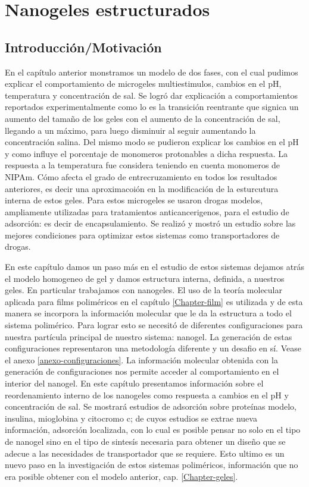 \chapter{Nanogeles estructurados}
\label{Chapter-esfericas}
\section{Introducci\'on/Motivaci\'on}

En el cap\'itulo anterior monstramos un modelo de dos fases, con el cual pudimos explicar el comportamiento de microgeles multiestimulos, cambios en el pH, temperatura y concentraci\'on de sal.
Se logró dar explicación a comportamientos reportados experimentalmente como lo es la transición reentrante que signica un aumento del tama\~no de los geles con el aumento de la concentraci\'on de sal, llegando a un m\'aximo, para luego disminuir al seguir aumentando la concentraci\'on salina. 
Del mismo modo se pudieron explicar los cambios en el pH y como influye el porcentaje de monomeros protonables a dicha respuesta. La respuesta a la temperatura fue considera teniendo en cuenta monomeros de NIPAm.
C\'omo afecta el grado de entrecruzamiento en todos los resultados anteriores, es decir una aproximacoi\'on en la modificaci\'on de la esturcutura interna de estos geles.
Para estos microgeles se usaron drogas modelos, ampliamente utilizadas para tratamientos anticancerigenos, para el estudio de adsorci\'on: es decir de encapsulamiento. Se realiz\'o y mostr\'o un estudio sobre las mejores condiciones para optimizar estos sistemas como transportadores de drogas.

En este cap\'itulo damos un paso m\'as en el estudio de estos sistemas dejamos atr\'as el modelo homogeneo de gel y damos estructura interna, definida, a nuestros geles. En particular trabajamos con nanogeles. 
El uso de la teor\'ia molecular aplicada para films polim\'ericos en el cap\'itulo \ref{Chapter-film} es utilizada y de esta manera se incorpora la informaci\'on molecular que le da la estructura a todo el sistema polim\'erico.
Para lograr esto se necesit\'o de diferentes configuraciones para nuestra part\'icula principal de nuestro sistema: nanogel.
La generación de estas configuraciones representaron una metodolog\'ia diferente y un desafio en s\'i. Vease el anexo \ref{anexo-configuraciones}.
La informaci\'on molecular obtenida con la generaci\'on de configuraciones nos permite acceder al comportamiento en el interior del nanogel. 
En este cap\'itulo presentamos informaci\'on sobre el reordenamiento interno de los nanogeles  como respuesta a cambios en el pH y concentraci\'on de sal. Se mostrar\'a estudios de adsorci\'on sobre prote\'inas modelo, insulina, mioglobina y citocromo c; de cuyos estudios se extrae nueva informaci\'on, adsorci\'on  localizada, con lo cual es posible pensar no solo en el tipo de nanogel sino en el tipo de sintes\'is necesaria para obtener un  dise\~no que se adecue a las necesidades de transportador que se requiere.
Esto ultimo es un nuevo paso en la investigaci\'on de estos sistemas polim\'ericos, informaci\'on que no era posible obtener con el modelo anterior, cap. \ref{Chapter-geles}.
